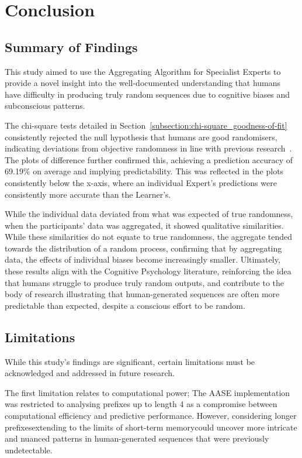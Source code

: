\section{Conclusion}\label{section:conclusion}
\subsection{Summary of Findings}\label{subsection:summary_of_findings}
This study aimed to use the Aggregating Algorithm for Specialist Experts to provide a novel insight into the well-documented understanding that humans have difficulty in producing truly random sequences due to cognitive biases and subconscious patterns.

The chi-square tests detailed in Section~\ref{subsection:chi-square_goodness-of-fit} consistently rejected the null hypothesis that humans are good randomisers, indicating deviations from objective randomness in line with previous research~\cite{nickerson:2009}. The plots of difference further confirmed this, achieving a prediction accuracy of 69.19\% on average and implying predictability. This was reflected in the plots consistently below the x-axis, where an individual Expert's predictions were consistently more accurate than the Learner's.

While the individual data deviated from what was expected of true randomness, when the participants' data was aggregated, it showed qualitative similarities. While these similarities do not equate to true randomness, the aggregate tended towards the distribution of a random process, confirming that by aggregating data, the effects of individual biases become increasingly smaller. Ultimately, these results align with the Cognitive Psychology literature, reinforcing the idea that humans struggle to produce truly random outputs, and contribute to the body of research illustrating that human-generated sequences are often more predictable than expected, despite a conscious effort to be random.

\subsection{Limitations}\label{subsection:limitations}
While this study's findings are significant, certain limitations must be acknowledged and addressed in future research.

The first limitation relates to computational power; The AASE implementation was restricted to analysing prefixes up to length 4 as a compromise between computational efficiency and predictive performance. However, considering longer prefixes\textemdash{}extending to the limits of short-term memory\textemdash{}could uncover more intricate and nuanced patterns in human-generated sequences that were previously undetectable.

